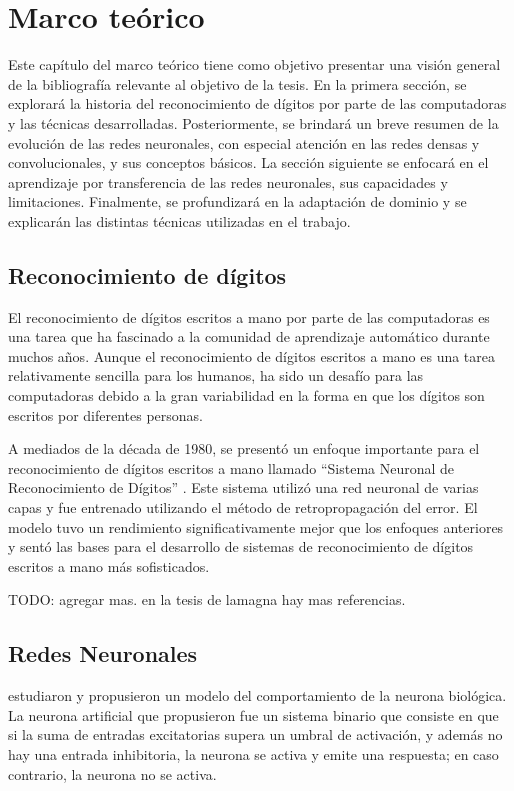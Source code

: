 \chapter{Marco teórico}
\label{Chapter2}

Este capítulo del marco teórico tiene como objetivo presentar una visión general de la bibliografía relevante al
objetivo de la tesis. En la primera sección, se explorará la historia del reconocimiento de dígitos por parte de las
computadoras y las técnicas desarrolladas. Posteriormente, se brindará un breve resumen de la evolución de las redes
neuronales, con especial atención en las redes densas y convolucionales, y sus conceptos básicos. La sección siguiente
se enfocará en el aprendizaje por transferencia de las redes neuronales, sus capacidades y limitaciones. Finalmente, se
profundizará en la adaptación de dominio y se explicarán las distintas técnicas utilizadas en el trabajo.

\section{Reconocimiento de dígitos}

El reconocimiento de dígitos escritos a mano por parte de las computadoras es una tarea que ha fascinado a la comunidad
de aprendizaje automático durante muchos años. Aunque el reconocimiento de dígitos escritos a mano es una tarea
relativamente sencilla para los humanos, ha sido un desafío para las computadoras debido a la gran variabilidad en la
forma en que los dígitos son escritos por diferentes personas.

A mediados de la década de 1980, se presentó un enfoque importante para el reconocimiento de dígitos escritos a mano
llamado ``Sistema Neuronal de Reconocimiento de Dígitos'' \parencite{lecun1989backpropagation}. Este sistema utilizó una red neuronal de varias capas y fue entrenado utilizando el
método de retropropagación del error. El modelo tuvo un rendimiento significativamente mejor que los enfoques
anteriores y sentó las bases para el desarrollo de sistemas de reconocimiento de dígitos escritos a mano más
sofisticados.

TODO: agregar mas. en la tesis de lamagna hay mas referencias.

\section{Redes Neuronales}
\cite{mcculloch1943logical} estudiaron y propusieron un modelo del comportamiento de la
neurona biológica. La neurona artificial que propusieron fue un sistema binario que consiste en que si la suma de entradas excitatorias supera un umbral de activación, y además no
hay una entrada inhibitoria, la neurona se activa y emite una respuesta; en caso contrario, la neurona no se activa.


